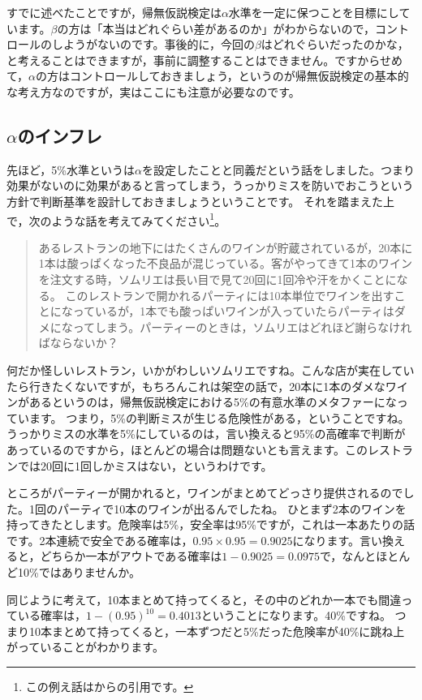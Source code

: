 \documentclass{ltjsbook}
\begin{document}
すでに述べたことですが，帰無仮説検定は$\alpha$水準を一定に保つことを目標にしています。$\beta$の方は「本当はどれぐらい差があるのか」がわからないので，コントロールのしようがないのです。事後的に，今回の$\beta$はどれぐらいだったのかな，と考えることはできますが，事前に調整することはできません。ですからせめて，$\alpha$の方はコントロールしておきましょう，というのが帰無仮説検定の基本的な考え方なのですが，実はここにも注意が必要なのです。

\subsection{$\alpha$のインフレ}
\label{sec:14_03}
先ほど，5\%水準というは$\alpha$を設定したことと同義だという話をしました。つまり効果がないのに効果があると言ってしまう，うっかりミスを防いでおこうという方針で判断基準を設計しておきましょうということです。
それを踏まえた上で，次のような話を考えてみてください\footnote{この例え話は\textcite{BA33892274}からの引用です。}。
\begin{quote}
	あるレストランの地下にはたくさんのワインが貯蔵されているが，20本に1本は酸っぱくなった不良品が混じっている。客がやってきて1本のワインを注文する時，ソムリエは長い目で見て20回に1回冷や汗をかくことになる。
	このレストランで開かれるパーティには10本単位でワインを出すことになっているが，1本でも酸っぱいワインが入っていたらパーティはダメになってしまう。パーティーのときは，ソムリエはどれほど謝らなければならないか？
\end{quote}

何だか怪しいレストラン，いかがわしいソムリエですね。こんな店が実在していたら行きたくないですが，もちろんこれは架空の話で，20本に1本のダメなワインがあるというのは，帰無仮説検定における5\%の有意水準のメタファーになっています。
つまり，5\%の判断ミスが生じる危険性がある，ということですね。
うっかりミスの水準を5\%にしているのは，言い換えると95\%の高確率で判断があっているのですから，ほとんどの場合は問題ないとも言えます。このレストランでは20回に1回しかミスはない，というわけです。

ところがパーティーが開かれると，ワインがまとめてどっさり提供されるのでした。1回のパーティで10本のワインが出るんでしたね。
ひとまず2本のワインを持ってきたとします。危険率は5\%，安全率は95\%ですが，これは一本あたりの話です。2本連続で安全である確率は，$0.95\times 0.95=0.9025$になります。言い換えると，どちらか一本がアウトである確率は$1-0.9025=0.0975$で，なんとほとんど10\%ではありませんか。

同じように考えて，10本まとめて持ってくると，その中のどれか一本でも間違っている確率は，$1-(0.95)^{10}=0.4013$ということになります。40\%ですね。
つまり10本まとめて持ってくると，一本ずつだと5\%だった危険率が40\%に跳ね上がっていることがわかります。
\end{document}
